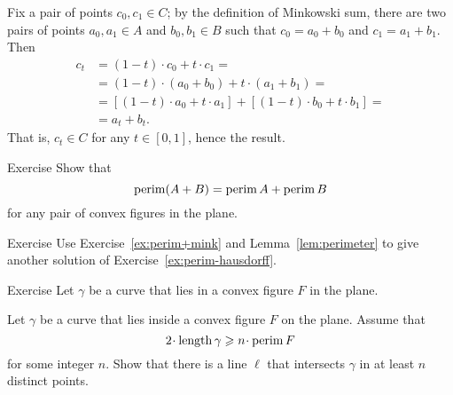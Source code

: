 Fix a pair of points $c_0,c_1\in C$;
by the definition of Minkowski sum, there are two pairs of points $a_0,a_1\in A$ and $b_0,b_1\in B$ such that $c_0=a_0+b_0$ and $c_1=a_1+b_1$.
Then 
\begin{align*}
c_t&=(1-t)\cdot c_0+t\cdot c_1=
\\
&=(1-t)\cdot (a_0+b_0)+t\cdot(a_1+b_1)=
\\
&=[(1-t)\cdot a_0+t\cdot a_1]+[(1-t)\cdot b_0+t\cdot b_1]=
\\
&=a_t+b_t.
\end{align*}
That is, $c_t\in C$ for any $t\in [0,1]$, hence the result.


\begin{thm}{Exercise}\label{ex:perim+mink}
Show that 
\[\mathop{\rm perim}\nolimits(A+B)=\mathop{\rm perim}\nolimits A+\mathop{\rm perim}\nolimits B\]
for any pair of convex figures in the plane.
\end{thm}

\begin{thm}{Exercise}
Use Exercise~\ref{ex:perim+mink} and Lemma~\ref{lem:perimeter} to give another solution of Exercise~\ref{ex:perim-hausdorff}.
\end{thm}

\begin{thm}{Exercise}
Let $\gamma$ be a curve that lies in a convex figure $F$ in the plane.

Let $\gamma$ be a curve that lies inside a convex figure $F$ on the plane.
Assume that
\[2\cdot \length \gamma\ge n\cdot \perim F\]
for some integer $n$.
Show that there is a line $\ell$ that intersects $\gamma$ in at least $n$ distinct points.
\end{thm}

